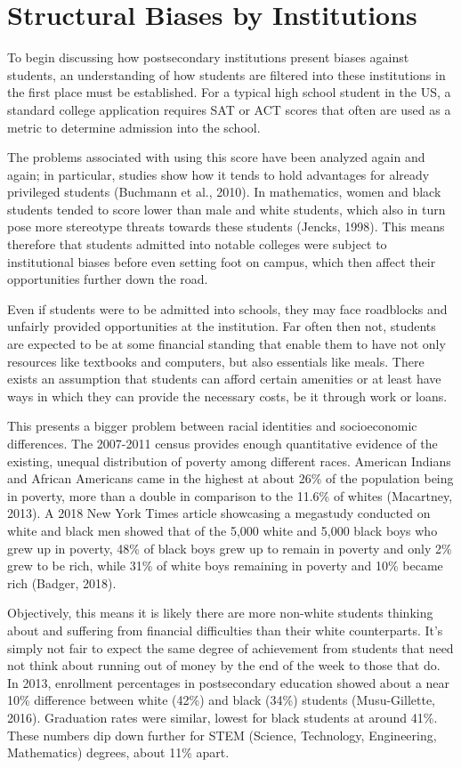 \section{Structural Biases by Institutions}
To begin discussing how postsecondary institutions present biases against students, an understanding of how students are filtered into these institutions in the first place must be established. For a typical high school student in the US, a standard college application requires SAT or ACT scores that often are used as a metric to determine admission into the school.

The problems associated with using this score have been analyzed again and again; in particular, studies show how it tends to hold advantages for already privileged students (Buchmann et al., 2010). In mathematics, women and black students tended to score lower than male and white students, which also in turn pose more stereotype threats towards these students (Jencks, 1998). This means therefore that students admitted into notable colleges were subject to institutional biases before even setting foot on campus, which then affect their opportunities further down the road.

Even if students were to be admitted into schools, they may face roadblocks and unfairly provided opportunities at the institution. Far often then not, students are expected to be at some financial standing that enable them to have not only resources like textbooks and computers, but also essentials like meals. There exists an assumption that students can afford certain amenities or at least have ways in which they can provide the necessary costs, be it through work or loans.

This presents a bigger problem between racial identities and socioeconomic differences. The 2007-2011 census provides enough quantitative evidence of the existing, unequal distribution of poverty among different races. American Indians and African Americans came in the highest at about 26\% of the population being in poverty, more than a double in comparison to the 11.6\% of whites (Macartney, 2013). A 2018 New York Times article showcasing a megastudy conducted on white and black men showed that of the 5,000 white and 5,000 black boys who grew up in poverty, 48\% of black boys grew up to remain in poverty and only 2\% grew to be rich, while 31\% of white boys remaining in poverty and 10\% became rich (Badger, 2018).

Objectively, this means it is likely there are more non-white students thinking about and suffering from financial difficulties than their white counterparts. It's simply not fair to expect the same degree of achievement from students that need not think about running out of money by the end of the week to those that do. In 2013, enrollment percentages in postsecondary education showed about a near 10\% difference between white (42\%) and black (34\%) students (Musu-Gillette, 2016). Graduation rates were similar, lowest for black students at around 41\%. These numbers dip down further for STEM (Science, Technology, Engineering, Mathematics) degrees, about 11\% apart.

